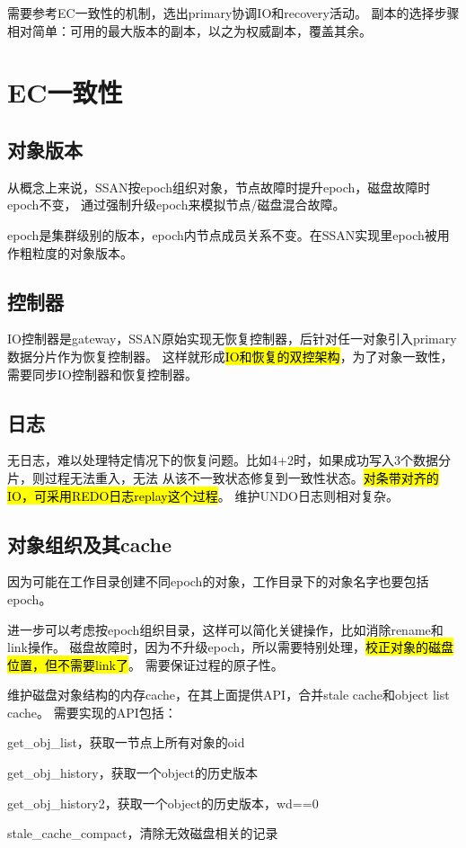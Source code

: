 需要参考EC一致性的机制，选出primary协调IO和recovery活动。
副本的选择步骤相对简单：可用的最大版本的副本，以之为权威副本，覆盖其余。

\section{EC一致性}

\subsection{对象版本}

从概念上来说，SSAN按epoch组织对象，节点故障时提升epoch，磁盘故障时epoch不变，
通过强制升级epoch来模拟节点/磁盘混合故障。

epoch是集群级别的版本，epoch内节点成员关系不变。在SSAN实现里epoch被用作粗粒度的对象版本。

\subsection{控制器}

IO控制器是gateway，SSAN原始实现无恢复控制器，后针对任一对象引入primary数据分片作为恢复控制器。
这样就形成\hl{IO和恢复的双控架构}，为了对象一致性，需要同步IO控制器和恢复控制器。

\subsection{日志}

无日志，难以处理特定情况下的恢复问题。比如4+2时，如果成功写入3个数据分片，则过程无法重入，无法
从该不一致状态修复到一致性状态。\hl{对条带对齐的IO，可采用REDO日志replay这个过程}。
维护UNDO日志则相对复杂。

\subsection{对象组织及其cache}
\label{subsec:object-dir}

因为可能在工作目录创建不同epoch的对象，工作目录下的对象名字也要包括epoch。

进一步可以考虑按epoch组织目录，这样可以简化关键操作，比如消除rename和link操作。
磁盘故障时，因为不升级epoch，所以需要特别处理，\hl{校正对象的磁盘位置，但不需要link了}。
需要保证过程的原子性。

维护磁盘对象结构的内存cache，在其上面提供API，合并stale cache和object list cache。
需要实现的API包括：
\begin{enumbox}
\item get\_obj\_list，获取一节点上所有对象的oid
\item get\_obj\_history，获取一个object的历史版本
\item get\_obj\_history2，获取一个object的历史版本，wd==0
\item stale\_cache\_compact，清除无效磁盘相关的记录
\end{enumbox}

